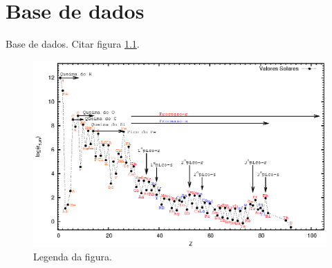\chapter{Base de dados}\label{database}

Base de dados. Citar figura \ref{identificador}.

\begin{figure}[!ht]
\begin{center}
\setcaptionmargin{1cm}
\includegraphics[width=1.0 \columnwidth,angle=0]{fig/solar_grevesse.eps}
\caption[Resumo da legenda da figura (aparece na lista de figuras)]{Legenda da figura.} 
\label{identificador}
\end{center}
\end{figure}


